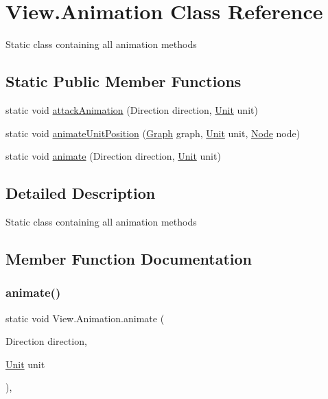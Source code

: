 \hypertarget{class_view_1_1_animation}{}\section{View.\+Animation Class Reference}
\label{class_view_1_1_animation}


Static class containing all animation methods  


\subsection*{Static Public Member Functions}
\begin{DoxyCompactItemize}
\item 
static void \hyperlink{class_view_1_1_animation_aac990350f0970496abd40f47618d657d}{attack\+Animation} (Direction direction, \hyperlink{interface_model_1_1_unit_module_1_1_unit}{Unit} unit)
\item 
static void \hyperlink{class_view_1_1_animation_a008dc7bbb7014aca9c1284613b25f356}{animate\+Unit\+Position} (\hyperlink{class_model_1_1_map_module_1_1_graph}{Graph} graph, \hyperlink{interface_model_1_1_unit_module_1_1_unit}{Unit} unit, \hyperlink{class_model_1_1_map_module_1_1_node}{Node} node)
\item 
static void \hyperlink{class_view_1_1_animation_a1b3724548dfd54526a24c8ed4706ee05}{animate} (Direction direction, \hyperlink{interface_model_1_1_unit_module_1_1_unit}{Unit} unit)
\end{DoxyCompactItemize}


\subsection{Detailed Description}
Static class containing all animation methods 



\subsection{Member Function Documentation}
\hypertarget{class_view_1_1_animation_a1b3724548dfd54526a24c8ed4706ee05}{}\label{class_view_1_1_animation_a1b3724548dfd54526a24c8ed4706ee05} 
\subsubsection{\texorpdfstring{animate()}{animate()}}
{\footnotesize\ttfamily static void View.\+Animation.\+animate (\begin{DoxyParamCaption}\item[{Direction}]{direction,  }\item[{\hyperlink{interface_model_1_1_unit_module_1_1_unit}{Unit}}]{unit }\end{DoxyParamCaption})\hspace{0.3cm}{\ttfamily [inline]}, {\ttfamily [static]}}

